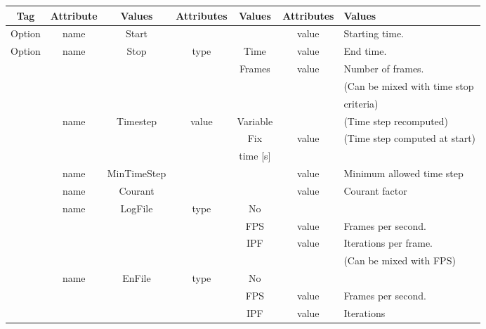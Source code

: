 \begin{table}[h!b!p!]\small
	\centering
	\begin{tabular}{| c | c | c | c | c | c | l | }
		\hline
		\cellcolor[rgb]{0.7,0.7,0.7}Tag & \cellcolor[rgb]{0.7,0.7,0.7}Attribute & \cellcolor[rgb]{0.7,0.7,0.7}Values & \cellcolor[rgb]{0.7,0.7,0.7}Attributes & \cellcolor[rgb]{0.7,0.7,0.7}Values & \cellcolor[rgb]{0.7,0.7,0.7}Attributes & \cellcolor[rgb]{0.7,0.7,0.7}Values \\
		\hline
		Option & name & Start &        &         & value  & Starting time. \\
		Option & name & Stop  & type   & Time    & value  & End time. \\
		       &      &                &         & Frames & value & Number of 
		       frames. \\
		       &      &                &        &         &       & (Can be 
		       mixed with time stop \\ 
		       &      &                &        &         &       & criteria) \\ 
		\hline
		       & name & Timestep       & value  & Variable &       & (Time 
		       step recomputed)\\
		       &      &                &        & Fix     & value & (Time step 
		       computed at start) \\
		       &      &                &        & time [s] & & \\
		\hline
		       & name & MinTimeStep    &        &         & value & Minimum 
		       allowed time step\\
		\hline
		       & name & Courant        &        &         & value & Courant 
		       factor\\
		\hline
		       & name & LogFile        & type   & No      &       & \\
		       &      &                &        & FPS     & value & Frames per second. \\
		       &      &                &        & IPF     & value & Iterations per frame. \\
		       &      &                &        &         &       & (Can be 
		       mixed with FPS) \\ 
		\hline
		       & name & EnFile        & type   & No      &       & \\
		       &      &                &        & FPS     & value & Frames per 
		       second. \\
		       &      &                &        & IPF     & value & Iterations 

\end{tabular}
\end{table}
